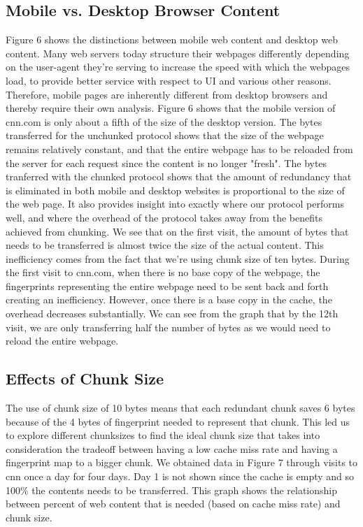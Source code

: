 \subsection{Mobile vs. Desktop Browser Content}
Figure 6 shows the distinctions between mobile web content and desktop web content. 
Many web servers today structure their webpages differently depending on the user-agent they're serving to increase the speed with which the webpages load, to provide better service with respect to UI and various other reasons. 
Therefore, mobile pages are inherently different from desktop browsers and thereby require their own analysis. 
Figure 6 shows that the mobile version of cnn.com is only about a fifth of the size of the desktop version. 
The bytes transferred for the unchunked protocol shows that the size of the webpage remains relatively constant, and that the entire webpage has to be reloaded from the server for each request since the content is no longer "fresh". 
The bytes tranferred with the chunked protocol shows that the amount of redundancy that is eliminated in both mobile and desktop websites is proportional to the size of the web page. 
It also provides insight into exactly where our protocol performs well, and where the overhead of the protocol takes away from the benefits achieved from chunking. 
We see that on the first visit, the amount of bytes that needs to be transferred is almost twice the size of the actual content. 
This inefficiency comes from the fact that we're using chunk size of ten bytes. 
During the first visit to cnn.com, when there is no base copy of the webpage, the fingerprints representing the entire webpage need to be sent back and forth creating an inefficiency. 
However, once there is a base copy in the cache, the overhead decreases substantially. 
We can see from the graph that by the 12th visit, we are only transferring half the number of bytes as we would need to reload the entire webpage. 

\subsection{Effects of Chunk Size}
The use of chunk size of 10 bytes means that each redundant chunk saves 6 bytes because of the 4 bytes of fingerprint needed to represent that chunk. 
This led us to explore different chunksizes to find the ideal chunk size that takes into consideration the tradeoff between having a low cache miss rate and having a fingerprint map to a bigger chunk.  We obtained data in Figure 7 through visits to cnn once a day for four days. Day 1 is not shown since the cache is empty and so 100\% the contents needs to be transferred. This graph shows the relationship between percent of web content that is needed (based on cache miss rate) and chunk size.


